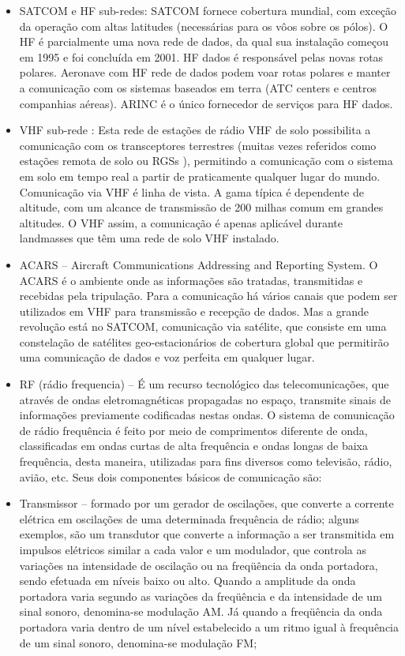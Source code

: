\begin{itemize}
	\item SATCOM e HF sub-redes: SATCOM fornece cobertura mundial, com exceção da operação com altas latitudes (necessárias para os vôos sobre os pólos). O HF é parcialmente uma nova rede de dados, da qual sua instalação começou em 1995 e foi concluída em 2001. HF dados é responsável pelas novas rotas polares. Aeronave com HF rede de dados podem voar rotas polares e manter a comunicação com os sistemas baseados em terra (ATC centers e centros companhias aéreas). ARINC é o único fornecedor de serviços para HF dados.

	\item VHF sub-rede : Esta rede de estações de rádio VHF de solo possibilita a comunicação com os transceptores terrestres (muitas vezes referidos como estações remota de solo ou RGSs ), permitindo a comunicação com o sistema em solo em tempo real a partir de praticamente qualquer lugar do mundo. Comunicação via VHF é linha de vista. A gama típica é dependente de altitude, com um alcance de transmissão de 200 milhas comum em grandes altitudes. O VHF assim, a comunicação é apenas aplicável durante landmasses que têm uma rede de solo VHF instalado.

	\item ACARS – Aircraft Communications Addressing and Reporting System. O ACARS é o ambiente onde as informações são tratadas, transmitidas e recebidas pela tripulação. Para a comunicação há vários canais que podem ser utilizados em VHF para transmissão e recepção de dados. Mas a grande revolução está no SATCOM, comunicação via satélite, que consiste em uma constelação de satélites geo-estacionários de cobertura global que permitirão uma comunicação de dados e voz perfeita em qualquer lugar.

	\item RF (rádio frequencia) – É um recurso tecnológico das telecomunicações, que através de ondas eletromagnéticas propagadas no espaço, transmite sinais de informações previamente codificadas nestas ondas. O sistema de comunicação de rádio frequência é feito por meio de comprimentos diferente de onda, classificadas em ondas curtas de alta frequência e ondas longas de baixa frequência, desta maneira, utilizadas para fins diversos como televisão, rádio, avião, etc. Seus dois componentes básicos de comunicação são:

	\item Transmissor – formado por um gerador de oscilações, que converte a corrente elétrica em oscilações de uma determinada frequência de rádio; alguns exemplos, são um transdutor que converte a informação a ser transmitida em impulsos elétricos similar a cada valor e um modulador, que controla as variações na intensidade de oscilação ou na freqüência da onda portadora, sendo efetuada em níveis baixo ou alto. Quando a amplitude da onda portadora varia segundo as variações da freqüência e da intensidade de um sinal sonoro, denomina-se modulação AM. Já quando a freqüência da onda portadora varia dentro de um nível estabelecido a um ritmo igual à frequência de um sinal sonoro, denomina-se modulação FM;


\end{itemize}
